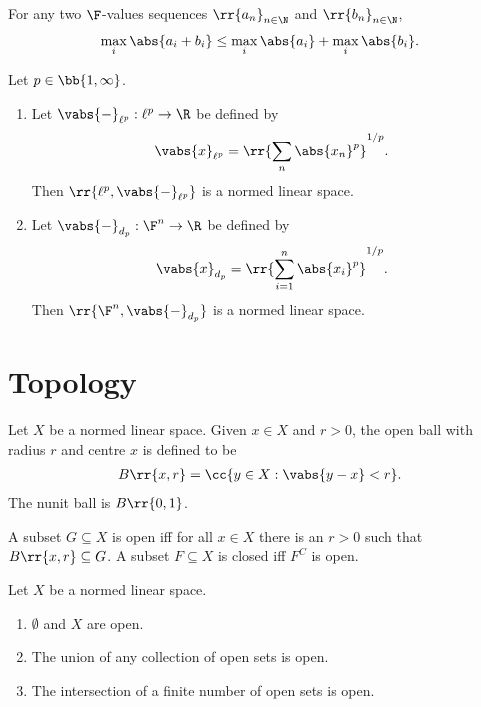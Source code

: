 \documentclass{article}
\begin{document}
\begin{theorem}
  \label{thm:minkowski-for-p-infinite}
  For any two $\F$-values sequences $ \rr{a_n}_{n\in\N}$ and $ \rr{b_n}_{n\in\N}$,
  \begin{align*}
    \max_i \abs{ a_i + b_i } \leq \max_i \abs{ a_i } + \max_i \abs{ b_i }.
  \end{align*}
\end{theorem}

\begin{theorem}
  \label{thm:dl-norms}
  Let $p\in \bb{ 1,\infty }$.
  \begin{enumerate}
    \item Let $ \vabs{ - }_{ \ell^p } : \ell^p \to \R$ be defined by \begin{align*}
        \vabs{ x }_{ \ell^p } = \rr{ \sum_{ n }^{  } \abs{ x_n }^p }^{1/p}.
      \end{align*}
      Then $ \rr{ \ell^p, \vabs{ - }_{ \ell^p } }$ is a normed linear space.
    \item Let $ \vabs{ - }_{ d_p } : \F^n \to \R$ be defined by \begin{align*}
        \vabs{ x }_{ d_p } = \rr{ \sum_{ i=1 }^{ n } \abs{ x_i }^p }^{1/p}.
      \end{align*}
      Then $ \rr{ \F^n, \vabs{ - }_{ d_p } } $ is a normed linear space.
  \end{enumerate}
\end{theorem}

\section{Topology} \label{sec:topology}

\begin{definition}
  \label{def:open}
  Let $X$ be a normed linear space. Given $x\in X$ and $r>0$, the open ball with radius
  $r$ and centre $x$ is defined to be
  \begin{align*}
    B\rr{x,r}=\cc{y\in X:\vabs{y-x}<r}.
  \end{align*}
  The nunit ball is $B\rr{0,1}$.

  A subset $G\subseteq X$ is open iff for all $x\in X$ there is an $r>0$ such that
  $B\rr{x,r}\subseteq G$. A subset $F\subseteq X$ is closed iff $F^C$ is open.
\end{definition}

\begin{theorem}
  Let $X$ be a normed linear space.
  \begin{enumerate}
    \item $\emptyset$ and $X$ are open.
    \item The union of any collection of open sets is open.
    \item The intersection of a finite number of open sets is open.
  \end{enumerate}
\end{theorem}
\end{document}
